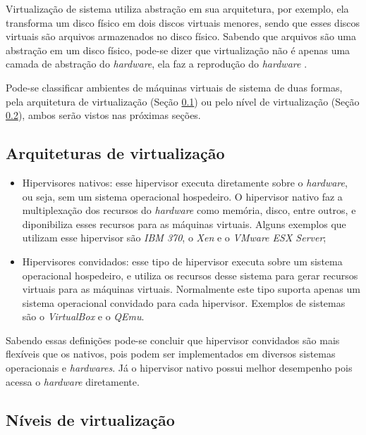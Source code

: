 Virtualização de sistema utiliza abstração em sua arquitetura, por exemplo, ela transforma um disco físico em dois discos 
virtuais menores, sendo que esses discos virtuais são arquivos armazenados no disco físico. Sabendo que arquivos são uma abstração
em um disco físico, pode-se dizer que virtualização não é apenas uma camada de abstração do \textit{hardware}, ela faz a reprodução 
do \textit{hardware} \cite{smithenair2005}.

Pode-se classificar ambientes de máquinas virtuais de sistema de duas formas, pela arquitetura de virtualização 
(Seção \ref{section:virtarq}) ou pelo nível de virtualização (Seção \ref{section:virtniv}), ambos serão vistos nas próximas seções.

\subsection{Arquiteturas de virtualização}
\label{section:virtarq}

\begin{itemize}
 \item Hipervisores nativos: esse hipervisor executa diretamente sobre o \textit{hardware}, ou seja, sem um sistema operacional
 hospedeiro. O hipervisor nativo faz a multiplexação dos recursos do \textit{hardware} como memória, disco, entre outros,
 e diponibiliza esses recursos para as máquinas virtuais. Alguns exemplos que utilizam esse hipervisor são \textit{IBM 370}, 
 o \textit{Xen} e o \textit{VMware ESX Server};
 \item Hipervisores convidados: esse tipo de hipervisor executa sobre um sistema operacional hospedeiro, e utiliza os recursos 
 desse sistema para gerar recursos virtuais para as máquinas virtuais. Normalmente este tipo suporta apenas um sistema 
 operacional convidado para cada hipervisor. Exemplos de sistemas são o \textit{VirtualBox} e o \textit{QEmu}.
\end{itemize}

Sabendo essas definições pode-se concluir que hipervisor convidados são mais flexíveis que os nativos, pois podem ser implementados
em diversos sistemas operacionais e \textit{hardwares}. Já o hipervisor nativo possui melhor desempenho pois acessa o \textit{hardware}
diretamente.

\subsection{Níveis de virtualização}
\label{section:virtniv}

